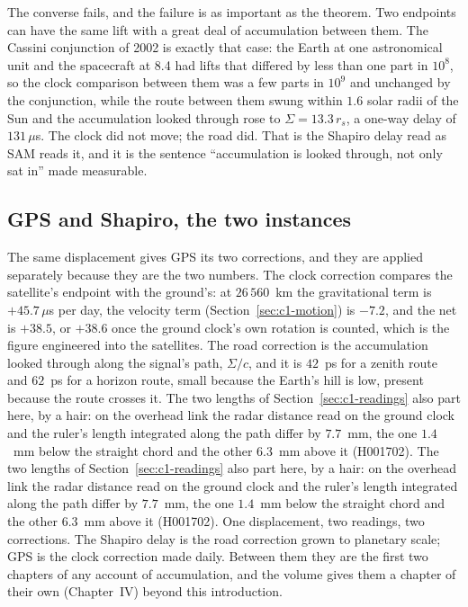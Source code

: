 The converse fails, and the failure is as important as the theorem. Two endpoints can have the same lift with a great deal of accumulation between them. The Cassini conjunction of 2002 is exactly that case: the Earth at one astronomical unit and the spacecraft at 8.4 had lifts that differed by less than one part in $10^{8}$, so the clock comparison between them was a few parts in $10^9$ and unchanged by the conjunction, while the route between them swung within $1.6$ solar radii of the Sun and the accumulation looked through rose to $\Sigma=13.3\,r_s$, a one-way delay of $131\,\mu$s. The clock did not move; the road did. That is the Shapiro delay read as SAM reads it, and it is the sentence ``accumulation is looked through, not only sat in'' made measurable.

\subsection{GPS and Shapiro, the two instances}

The same displacement gives GPS its two corrections, and they are applied separately because they are the two numbers. The clock correction compares the satellite's endpoint with the ground's: at $26\,560$~km the gravitational term is $+45.7\,\mu$s per day, the velocity term (Section~\ref{sec:c1-motion}) is $-7.2$, and the net is $+38.5$, or $+38.6$ once the ground clock's own rotation is counted, which is the figure engineered into the satellites. The road correction is the accumulation looked through along the signal's path, $\Sigma/c$, and it is $42$~ps for a zenith route and $62$~ps for a horizon route, small because the Earth's hill is low, present because the route crosses it. The two lengths of Section~\ref{sec:c1-readings} also part here, by a hair: on the overhead link the radar distance read on the ground clock and the ruler's length integrated along the path differ by $7.7$~mm, the one $1.4$~mm below the straight chord and the other $6.3$~mm above it (H001702). The two lengths of Section~\ref{sec:c1-readings} also part here, by a hair: on the overhead link the radar distance read on the ground clock and the ruler's length integrated along the path differ by $7.7$~mm, the one $1.4$~mm below the straight chord and the other $6.3$~mm above it (H001702). One displacement, two readings, two corrections. The Shapiro delay is the road correction grown to planetary scale; GPS is the clock correction made daily. Between them they are the first two chapters of any account of accumulation, and the volume gives them a chapter of their own (Chapter~IV) beyond this introduction.

